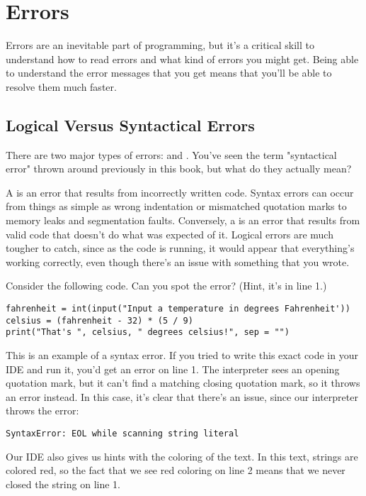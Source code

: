 \section{Errors}
Errors are an inevitable part of programming, but it's a critical skill to understand how to read errors and what kind of errors you might get. Being able to understand the error messages that you get means that you'll be able to resolve them much faster.\par
\subsection{Logical Versus Syntactical Errors}
There are two major types of errors:  and . You've seen the term "syntactical error" thrown around previously in this book, but what do they actually mean?\par
A  is an error that results from incorrectly written code. Syntax errors can occur from things as simple as wrong indentation or mismatched quotation marks to memory leaks and segmentation faults. Conversely, a  is an error that results from valid code that doesn't do what was expected of it. Logical errors are much tougher to catch, since as the code is running, it would appear that everything's working correctly, even though there's an issue with something that you wrote.\par
Consider the following code. Can you spot the error? (Hint, it's in line 1.)
\begin{lstlisting}[style=pippython]
fahrenheit = int(input("Input a temperature in degrees Fahrenheit'))
celsius = (fahrenheit - 32) * (5 / 9)
print("That's ", celsius, " degrees celsius!", sep = "")
\end{lstlisting}
This is an example of a syntax error. If you tried to write this exact code in your IDE and run it, you'd get an error on line 1. The interpreter sees an opening quotation mark, but it can't find a matching closing quotation mark, so it throws an error instead. In this case, it's clear that there's an issue, since our interpreter throws the error:
\begin{lstlisting}[style=none]
SyntaxError: EOL while scanning string literal
\end{lstlisting}
Our IDE also gives us hints with the coloring of the text. In this text, strings are colored red, so the fact that we see red coloring on line 2 means that we never closed the string on line 1.
